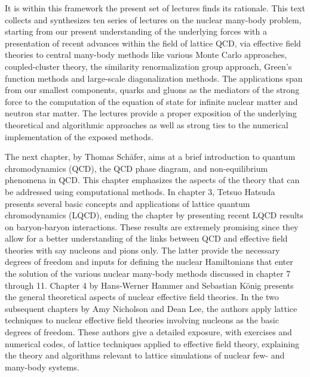 It is within this framework the present set of lectures finds its rationale.
This text collects and synthesizes ten series of lectures on the
nuclear many-body problem, starting from our present understanding of
the underlying forces with a presentation of recent advances within
the field of lattice QCD, via effective field theories to central
many-body methods like various Monte Carlo approaches, coupled-cluster
theory, the similarity renormalization group approach, Green's
function methods and large-scale diagonalization methods.  The
applications span from our smallest components, quarks and gluons as
the mediators of the strong force to the computation of the equation
of state for infinite nuclear matter and neutron star matter.  The
lectures provide a proper exposition of the underlying theoretical and
algorithmic approaches as well as strong ties to the numerical
implementation of the exposed methods.  

The next chapter, by Thomas Sch\"afer, aims at a brief introduction to
quantum chromodynamics (QCD), the QCD phase diagram, and
non-equilibrium phenomena in QCD. This chapter emphasizes the aspects
of the theory that can be addressed using computational methods. In
chapter 3, Tetsuo Hatsuda presents several basic concepts and
applications of lattice quantum chromodynamics (LQCD), ending the
chapter by presenting recent LQCD results on baryon-baryon
interactions.  These results are extremely promising since they allow
for a better understanding of the links between QCD and effective
field theories with say nucleons and pions only. The latter provide
the necessary degrees of freedom and inputs for defining the nuclear
Hamiltonians that enter the solution of the various nuclear many-body
methods discussed in chapter 7 through 11. Chapter 4 by Hans-Werner Hammer and Sebastian K\"onig
presents the general theoretical aspects of nuclear effective field
theories. In the two subsequent chapters by Amy Nicholson and Dean
Lee, the authors apply lattice techniques to nuclear effective field
theories involving nucleons as the basic degrees of freedom. These
authors give a detailed exposure, with exercises and numerical codes,
of lattice techniques applied to effective field theory, explaining
the theory and algorithms relevant to lattice simulations of nuclear
few- and many-body systems.  

